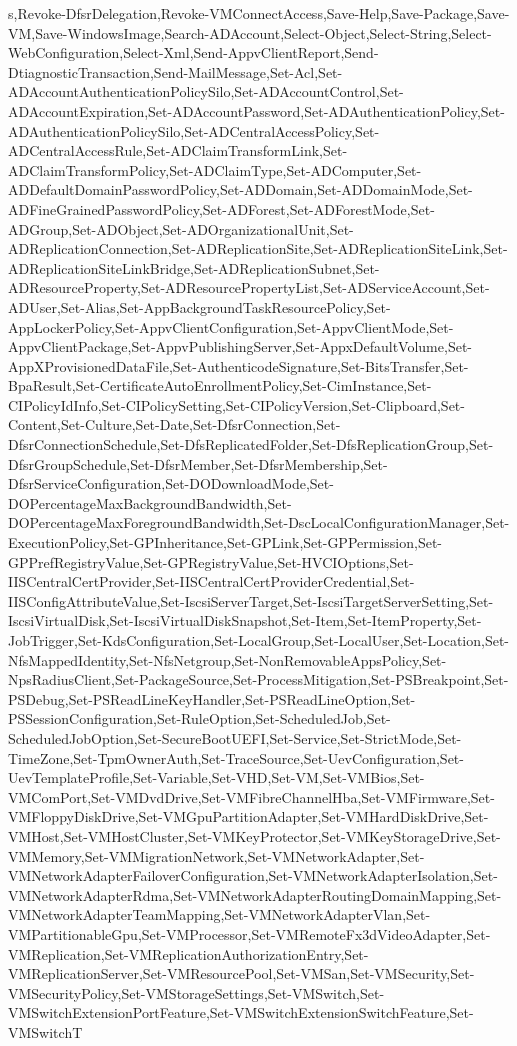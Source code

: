 {{s,Revoke-DfsrDelegation,Revoke-VMConnectAccess,Save-Help,Save-Package,Save-VM,Save-WindowsImage,Search-ADAccount,Select-Object,Select-String,Select-WebConfiguration,Select-Xml,Send-AppvClientReport,Send-DtiagnosticTransaction,Send-MailMessage,Set-Acl,Set-ADAccountAuthenticationPolicySilo,Set-ADAccountControl,Set-ADAccountExpiration,Set-ADAccountPassword,Set-ADAuthenticationPolicy,Set-ADAuthenticationPolicySilo,Set-ADCentralAccessPolicy,Set-ADCentralAccessRule,Set-ADClaimTransformLink,Set-ADClaimTransformPolicy,Set-ADClaimType,Set-ADComputer,Set-ADDefaultDomainPasswordPolicy,Set-ADDomain,Set-ADDomainMode,Set-ADFineGrainedPasswordPolicy,Set-ADForest,Set-ADForestMode,Set-ADGroup,Set-ADObject,Set-ADOrganizationalUnit,Set-ADReplicationConnection,Set-ADReplicationSite,Set-ADReplicationSiteLink,Set-ADReplicationSiteLinkBridge,Set-ADReplicationSubnet,Set-ADResourceProperty,Set-ADResourcePropertyList,Set-ADServiceAccount,Set-ADUser,Set-Alias,Set-AppBackgroundTaskResourcePolicy,Set-AppLockerPolicy,Set-AppvClientConfiguration,Set-AppvClientMode,Set-AppvClientPackage,Set-AppvPublishingServer,Set-AppxDefaultVolume,Set-AppXProvisionedDataFile,Set-AuthenticodeSignature,Set-BitsTransfer,Set-BpaResult,Set-CertificateAutoEnrollmentPolicy,Set-CimInstance,Set-CIPolicyIdInfo,Set-CIPolicySetting,Set-CIPolicyVersion,Set-Clipboard,Set-Content,Set-Culture,Set-Date,Set-DfsrConnection,Set-DfsrConnectionSchedule,Set-DfsReplicatedFolder,Set-DfsReplicationGroup,Set-DfsrGroupSchedule,Set-DfsrMember,Set-DfsrMembership,Set-DfsrServiceConfiguration,Set-DODownloadMode,Set-DOPercentageMaxBackgroundBandwidth,Set-DOPercentageMaxForegroundBandwidth,Set-DscLocalConfigurationManager,Set-ExecutionPolicy,Set-GPInheritance,Set-GPLink,Set-GPPermission,Set-GPPrefRegistryValue,Set-GPRegistryValue,Set-HVCIOptions,Set-IISCentralCertProvider,Set-IISCentralCertProviderCredential,Set-IISConfigAttributeValue,Set-IscsiServerTarget,Set-IscsiTargetServerSetting,Set-IscsiVirtualDisk,Set-IscsiVirtualDiskSnapshot,Set-Item,Set-ItemProperty,Set-JobTrigger,Set-KdsConfiguration,Set-LocalGroup,Set-LocalUser,Set-Location,Set-NfsMappedIdentity,Set-NfsNetgroup,Set-NonRemovableAppsPolicy,Set-NpsRadiusClient,Set-PackageSource,Set-ProcessMitigation,Set-PSBreakpoint,Set-PSDebug,Set-PSReadLineKeyHandler,Set-PSReadLineOption,Set-PSSessionConfiguration,Set-RuleOption,Set-ScheduledJob,Set-ScheduledJobOption,Set-SecureBootUEFI,Set-Service,Set-StrictMode,Set-TimeZone,Set-TpmOwnerAuth,Set-TraceSource,Set-UevConfiguration,Set-UevTemplateProfile,Set-Variable,Set-VHD,Set-VM,Set-VMBios,Set-VMComPort,Set-VMDvdDrive,Set-VMFibreChannelHba,Set-VMFirmware,Set-VMFloppyDiskDrive,Set-VMGpuPartitionAdapter,Set-VMHardDiskDrive,Set-VMHost,Set-VMHostCluster,Set-VMKeyProtector,Set-VMKeyStorageDrive,Set-VMMemory,Set-VMMigrationNetwork,Set-VMNetworkAdapter,Set-VMNetworkAdapterFailoverConfiguration,Set-VMNetworkAdapterIsolation,Set-VMNetworkAdapterRdma,Set-VMNetworkAdapterRoutingDomainMapping,Set-VMNetworkAdapterTeamMapping,Set-VMNetworkAdapterVlan,Set-VMPartitionableGpu,Set-VMProcessor,Set-VMRemoteFx3dVideoAdapter,Set-VMReplication,Set-VMReplicationAuthorizationEntry,Set-VMReplicationServer,Set-VMResourcePool,Set-VMSan,Set-VMSecurity,Set-VMSecurityPolicy,Set-VMStorageSettings,Set-VMSwitch,Set-VMSwitchExtensionPortFeature,Set-VMSwitchExtensionSwitchFeature,Set-VMSwitchT}}
